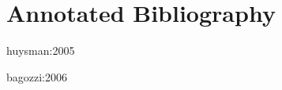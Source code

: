 \documentclass[12pt]{article}
\begin{document}
\tlpage{}
\section*{Annotated Bibliography}
\begin{bibentry}{huysman:2005}
	\lipsum[3]
\end{bibentry}
\begin{bibentry}{bagozzi:2006}
	\lipsum[2]
\end{bibentry}
\newpage
\end{document}
